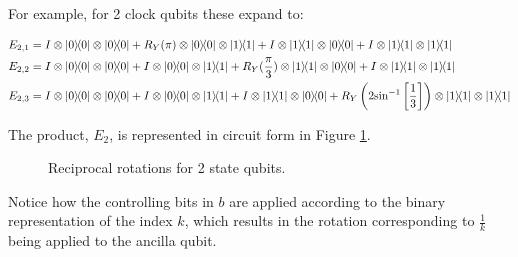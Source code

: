 \documentclass[12pt]{extarticle}
\begin{document}
For example, for 2 clock qubits these expand to:
\begin{footnotesize}
\begin{align*}
E_{2,1} &= I \otimes \outerproduct{0} \otimes \outerproduct{0}
         + R_Y(\pi) \otimes \outerproduct{0} \otimes \outerproduct{1}
         + I \otimes \outerproduct{1} \otimes \outerproduct{0}
         + I \otimes \outerproduct{1} \otimes \outerproduct{1} \\
E_{2,2} &= I \otimes \outerproduct{0} \otimes \outerproduct{0}
         + I \otimes \outerproduct{0} \otimes \outerproduct{1}
         + R_Y(\frac{\pi}{3}) \otimes \outerproduct{1} \otimes \outerproduct{0}
         + I \otimes \outerproduct{1} \otimes \outerproduct{1} \\
E_{2,3} &= I \otimes \outerproduct{0} \otimes \outerproduct{0}
            + I \otimes \outerproduct{0} \otimes \outerproduct{1}
            + I \otimes \outerproduct{1} \otimes \outerproduct{0}
            + R_Y\left(2\inv{\sin}\left[\frac{1}{3}\right]\right) \otimes \outerproduct{1} \otimes \outerproduct{1} \\
\end{align*}
\end{footnotesize}
The product, $E_2$, is represented in circuit form in Figure \ref{fig:reciprocalrot2}.

\begin{figure}[h]
    \centering
    \caption{Reciprocal rotations for 2 state qubits.}
    \label{fig:reciprocalrot2}
\end{figure}

Notice how the controlling bits in $b$ are applied according to the binary representation of the index $k$,
which results in the rotation corresponding to $\frac{1}{k}$ being applied to the ancilla qubit.
\end{document}

